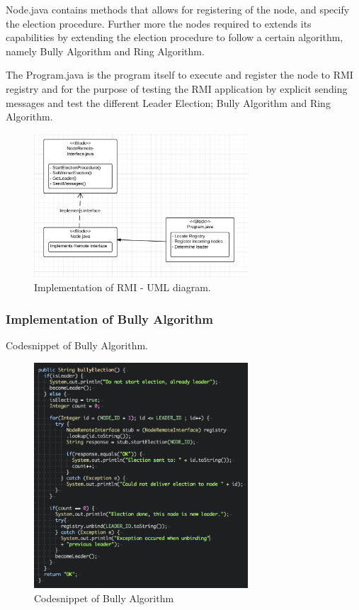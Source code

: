 Node.java contains methods that allows for registering of the node, and specify the election procedure. Further more the nodes required to extends its capabilities by extending the election procedure to follow a certain algorithm, namely Bully Algorithm and Ring Algorithm.

The Program.java is the program itself to execute and register the node to RMI registry and for the purpose of testing the RMI application by explicit sending messages and test the different Leader Election; Bully Algorithm and Ring Algorithm.

\begin{figure}[ht!]
\centering
\includegraphics[width=80mm]{img/Implementation_uml_diagram.png}
\caption{Implementation of RMI - UML diagram.}
\label{Implementation of RMI - UML diagram}
\end{figure}

\subsubsection{Implementation of Bully Algorithm}
Codesnippet of Bully Algorithm.

\begin{figure}[ht!]
\centering
\includegraphics[width=80mm]{img/bully_election_code.png}
\caption{Codesnippet of Bully Algorithm}
\label{Codesnippet of Bully Algorithm}
\end{figure}


